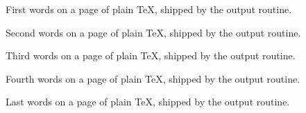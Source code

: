    
\def\para#1{#1 words on a page of plain \TeX, shipped by the output
  routine.\par}
\para{First}
\para{Second}
\vfill\eject
\para{Third}
\para{Fourth}
\para{Last}
\bye

